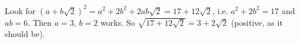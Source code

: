 Look for $(a+b\sqrt2)^2=a^2+2b^2+2ab\sqrt2=17+12\sqrt2$, i.e. $a^2+2b^2=17$ and $ab=6$. Then $a=3$, $b=2$ works. So $\sqrt{17+12\sqrt2}=\boxed{3+2\sqrt2}$ (positive, as it should be).
